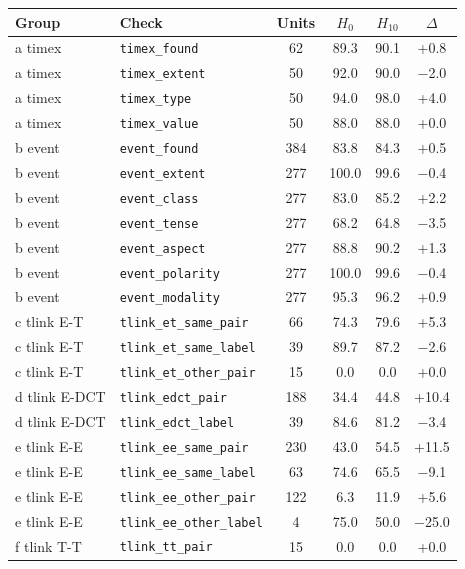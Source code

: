 \begin{tabular}{@{}llcccc@{}}
\toprule
Group & Check & Units & $H_0$ & $H_{10}$ & $\Delta$ \\
\midrule
a timex & \texttt{timex\_found} & 62 & 89.3 & 90.1 & +0.8 \\
a timex & \texttt{timex\_extent} & 50 & 92.0 & 90.0 & $-$2.0 \\
a timex & \texttt{timex\_type} & 50 & 94.0 & 98.0 & +4.0 \\
a timex & \texttt{timex\_value} & 50 & 88.0 & 88.0 & +0.0 \\
b event & \texttt{event\_found} & 384 & 83.8 & 84.3 & +0.5 \\
b event & \texttt{event\_extent} & 277 & 100.0 & 99.6 & $-$0.4 \\
b event & \texttt{event\_class} & 277 & 83.0 & 85.2 & +2.2 \\
b event & \texttt{event\_tense} & 277 & 68.2 & 64.8 & $-$3.5 \\
b event & \texttt{event\_aspect} & 277 & 88.8 & 90.2 & +1.3 \\
b event & \texttt{event\_polarity} & 277 & 100.0 & 99.6 & $-$0.4 \\
b event & \texttt{event\_modality} & 277 & 95.3 & 96.2 & +0.9 \\
c tlink E-T & \texttt{tlink\_et\_same\_pair} & 66 & 74.3 & 79.6 & +5.3 \\
c tlink E-T & \texttt{tlink\_et\_same\_label} & 39 & 89.7 & 87.2 & $-$2.6 \\
c tlink E-T & \texttt{tlink\_et\_other\_pair} & 15 & 0.0 & 0.0 & +0.0 \\
d tlink E-DCT & \texttt{tlink\_edct\_pair} & 188 & 34.4 & 44.8 & +10.4 \\
d tlink E-DCT & \texttt{tlink\_edct\_label} & 39 & 84.6 & 81.2 & $-$3.4 \\
e tlink E-E & \texttt{tlink\_ee\_same\_pair} & 230 & 43.0 & 54.5 & +11.5 \\
e tlink E-E & \texttt{tlink\_ee\_same\_label} & 63 & 74.6 & 65.5 & $-$9.1 \\
e tlink E-E & \texttt{tlink\_ee\_other\_pair} & 122 & 6.3 & 11.9 & +5.6 \\
e tlink E-E & \texttt{tlink\_ee\_other\_label} & 4 & 75.0 & 50.0 & $-$25.0 \\
f tlink T-T & \texttt{tlink\_tt\_pair} & 15 & 0.0 & 0.0 & +0.0 \\
\bottomrule
\end{tabular}
